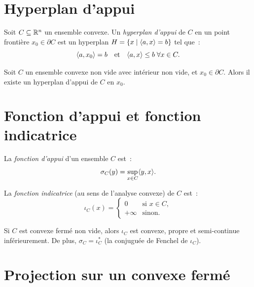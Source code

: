 \section{Hyperplan d'appui}

\begin{definition}
Soit $C \subseteq \mathbb{R}^n$ un ensemble convexe. Un \emph{hyperplan d'appui} de $C$
en un point fronti\`ere $x_0 \in \partial C$ est un hyperplan $H = \{x \mid \langle a, x \rangle = b\}$
tel que~:
\[
    \langle a, x_0 \rangle = b \quad \text{et} \quad
    \langle a, x \rangle \leq b \; \forall x \in C.
\]
\end{definition}

\begin{theoreme}
Soit $C$ un ensemble convexe non vide avec int\'erieur non vide, et $x_0 \in \partial C$.
Alors il existe un hyperplan d'appui de $C$ en $x_0$.
\end{theoreme}

\section{Fonction d'appui et fonction indicatrice}

\begin{definition}
La \emph{fonction d'appui} d'un ensemble $C$ est~:
\[
    \sigma_C(y) = \sup_{x \in C} \langle y, x \rangle.
\]
\end{definition}

\begin{definition}
La \emph{fonction indicatrice} (au sens de l'analyse convexe) de $C$ est~:
\[
    \iota_C(x) = \begin{cases} 0 & \text{si } x \in C, \\ +\infty & \text{sinon.} \end{cases}
\]
\end{definition}

\begin{proposition}
Si $C$ est convexe ferm\'e non vide, alors $\iota_C$ est convexe, propre et
semi-continue inf\'erieurement. De plus, $\sigma_C = \iota_C^*$ (la conjugu\'ee de
Fenchel de $\iota_C$).
\end{proposition}

\section{Projection sur un convexe ferm\'e}


